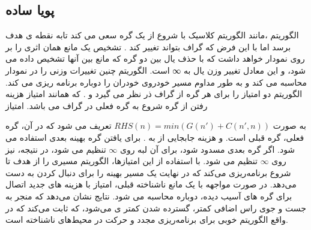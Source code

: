 
\subsection{پویا ساده}

الگوریتم
،مانند الگوریتم 
کلاسیک با شروع از یک گره سعی می کند تابه نقطه ی هدف برسد اما با این فرض که گراف بتواند تغییر کند . تشخیص یک مانع همان اثری را بر روی نمودار خواهد داشت که با حذف یال بین دو گره که مانع بین آنها تشخیص داده می شود، و این معادل تغییر وزن یال به ∞ است. الگوریتم
چنین تغییرات وزنی را در نمودار محاسبه می کند و به طور مداوم مسیر خودروی خودران را دوباره برنامه ریزی می کند.
الگوریتم
دو امتیاز را برای هر گره از گراف ذر نظر می گیرد  
و  
.  که همانند 
امتیاز
هزینه رفتن از گره شروع به گره فعلی در گراف می باشد. امتیاز

به صورت
$RHS(n) = min(G(n′) + C(n′, n)) $
تعریف می شود که در آن،
گره فعلی، 
گره قبلی است.  و  
هزینه جابجایی از 
به
. برای یافتن گره بهینه بعدی استفاده می شود. اگر گره بعدی مسدود شود،
برای آن لبه روی 
$\infty$ 
تنظیم می شود، در نتیجه،
نیز روی 
$\infty$
تنظیم می شود. با استفاده از این امتیازها، الگوریتم مسیری را از هدف تا شروع برنامه‌ریزی می‌کند که در نهایت یک مسیر بهینه را برای دنبال کردن به دست می‌دهد. در صورت مواجهه با یک مانع ناشناخته قبلی، امتیاز 
با هزینه های جدید اتصال برای گره های آسیب دیده، دوباره محاسبه می شود. نتایج نشان می‌دهد که
منجر به جست و جوی راس اضافی کمتر، گسترده شدن کمتر ی می‌شود، که ثابت می‌کند که
در واقع الگوریتم خوبی برای برنامه‌ریزی مجدد و حرکت در محیط‌های ناشناخته است.


